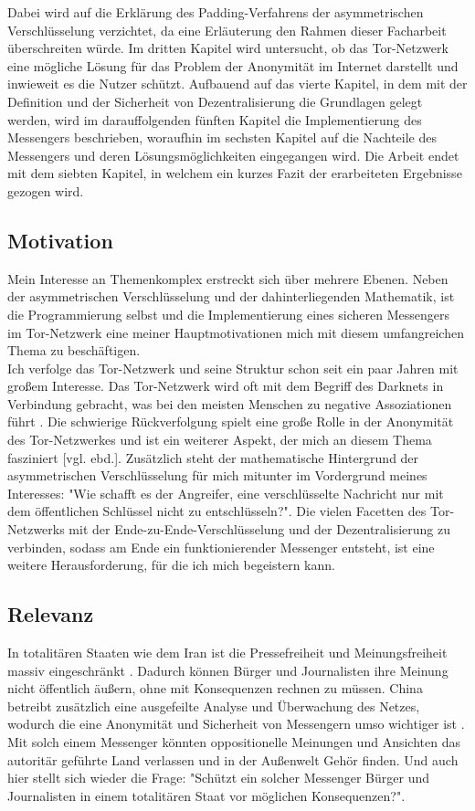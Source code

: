 \documentclass[a4paper,ngerman, headheight=28pt,12pt, footheight=27pt]{scrartcl}
\newcommand{\vcite}[1]{\cite[vgl.][]{#1}}
\newcommand{\vebd}{[vgl. ebd.]}
\begin{document}
Dabei wird auf die Erklärung des Padding-Verfahrens der asymmetrischen Verschlüsselung verzichtet, da eine Erläuterung den Rahmen dieser Facharbeit überschreiten würde. Im dritten Kapitel wird untersucht, ob das Tor-Netzwerk eine mögliche Lösung für das Problem der Anonymität im Internet darstellt und inwieweit es die Nutzer schützt.
Aufbauend auf das vierte Kapitel, in dem mit der Definition und der Sicherheit von Dezentralisierung die Grundlagen gelegt werden, wird im darauffolgenden fünften Kapitel die Implementierung des Messengers beschrieben, woraufhin im sechsten Kapitel auf die Nachteile des Messengers und deren Lösungsmöglichkeiten eingegangen wird. Die Arbeit endet mit dem siebten Kapitel, in welchem ein kurzes Fazit der erarbeiteten Ergebnisse gezogen wird.

\subsection{Motivation}
Mein Interesse an Themenkomplex erstreckt sich über mehrere Ebenen. Neben der asymmetrischen Verschlüsselung und der dahinterliegenden Mathematik, ist die Programmierung selbst und die Implementierung eines sicheren Messengers im Tor-Netzwerk eine meiner Hauptmotivationen mich mit diesem umfangreichen Thema zu beschäftigen. \\
Ich verfolge das Tor-Netzwerk und seine Struktur schon seit ein paar Jahren mit großem Interesse. Das Tor-Netzwerk wird oft mit dem Begriff des Darknets in Verbindung gebracht, was bei den meisten Menschen zu negative Assoziationen führt \vcite{BsiTorDarknet}. Die schwierige Rückverfolgung spielt eine große Rolle in der Anonymität des Tor-Netzwerkes und ist ein weiterer Aspekt, der mich an diesem Thema fasziniert \vebd.
Zusätzlich steht der mathematische Hintergrund der asymmetrischen Verschlüsselung für mich mitunter im Vordergrund meines Interesses: "Wie schafft es der Angreifer, eine verschlüsselte Nachricht nur mit dem öffentlichen Schlüssel nicht zu entschlüsseln?".
Die vielen Facetten des Tor-Netzwerks mit der Ende-zu-Ende-Verschlüsselung und der Dezentralisierung zu verbinden, sodass am Ende ein funktionierender Messenger entsteht, ist eine weitere Herausforderung, für die ich mich begeistern kann.

\subsection{Relevanz}
In totalitären Staaten wie dem Iran ist die Pressefreiheit und Meinungsfreiheit massiv eingeschränkt \vcite{AmnReport}. Dadurch können Bürger und Journalisten ihre Meinung nicht öffentlich äußern, ohne mit Konsequenzen rechnen zu müssen. China betreibt zusätzlich eine ausgefeilte Analyse und Überwachung des Netzes, wodurch die eine Anonymität und Sicherheit von Messengern umso wichtiger ist \vcite{GreatFirewallChina}. Mit solch einem Messenger könnten oppositionelle Meinungen und Ansichten das autoritär geführte Land verlassen und in der Außenwelt Gehör finden. Und auch hier stellt sich wieder die Frage: "Schützt ein solcher Messenger Bürger und Journalisten in einem totalitären Staat vor möglichen Konsequenzen?".
\end{document}
